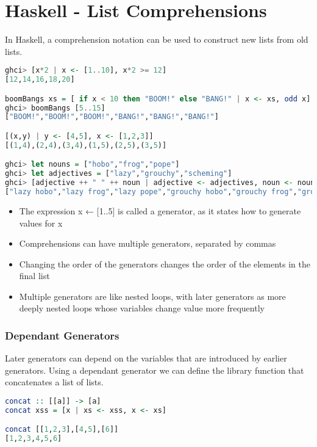 \hypertarget{haskell}{%
\section{Haskell - List Comprehensions}\label{haskell}}

In Haskell, a comprehension notation can be used to construct new lists
from old lists.

\begin{lstlisting}[language=Haskell]
ghci> [x*2 | x <- [1..10], x*2 >= 12]  
[12,14,16,18,20]

boomBangs xs = [ if x < 10 then "BOOM!" else "BANG!" | x <- xs, odd x]
ghci> boomBangs [5..15]
["BOOM!","BOOM!","BOOM!","BANG!","BANG!","BANG!"]

[(x,y) | y <- [4,5], x <- [1,2,3]]
[(1,4),(2,4),(3,4),(1,5),(2,5),(3,5)]

ghci> let nouns = ["hobo","frog","pope"]  
ghci> let adjectives = ["lazy","grouchy","scheming"]  
ghci> [adjective ++ " " ++ noun | adjective <- adjectives, noun <- nouns]  
["lazy hobo","lazy frog","lazy pope","grouchy hobo","grouchy frog","grouchy pope","scheming hobo","scheming frog","scheming pope"]   
\end{lstlisting}

\begin{itemize}
\tightlist
\item
  The expression x ← {[}1..5{]} is called a generator, as it states how
  to generate values for x
\item
  Comprehensions can have multiple generators, separated by commas
\item
  Changing the order of the generators changes the order of the elements
  in the final list
\item
  Multiple generators are like nested loops, with later generators as
  more deeply nested loops whose variables change value more frequently
\end{itemize}

\hypertarget{dependant-generators}{%
\subsubsection{Dependant Generators}\label{dependant-generators}}

Later generators can depend on the variables that are introduced by
earlier generators. Using a dependant generator we can define the
library function that concatenates a list of lists.

\begin{lstlisting}[language=Haskell]
concat :: [[a]] -> [a]
concat xss = [x | xs <- xss, x <- xs]

concat [[1,2,3],[4,5],[6]]
[1,2,3,4,5,6]
\end{lstlisting}


